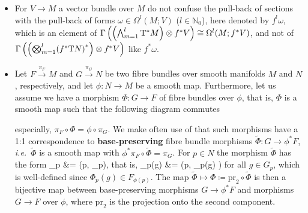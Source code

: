 \documentclass[a4paper,oneside,11pt,bibliography=totoc]{scrartcl}
\def\ba#1\ea{\begin{align}#1\end{align}}
\def\bas#1\eas{\begin{align*}#1\end{align*}}
\theoremstyle{plain}
\theoremstyle{remark}
\theoremstyle{definition}
\begin{document}
\begin{itemize}
	\item For $V \to M$ a vector bundle over $M$ do not confuse the pull-back of sections with the pull-back of forms $\omega \in \Omega^l(M; V)$ ($l \in \mathbb{N}_0$), here denoted by $f^!\omega$, which is an element of $\Gamma\left( \mleft(\bigwedge_{m=1}^{l} \mathrm{T}^*M \mright) \otimes f^*V \right) \cong \Omega^l(M; f^*V)$, and not of $\Gamma\left( \mleft(\bigotimes_{m=1}^{l} \mleft(f^*\mathrm{T}N\mright)^*\mright) \otimes f^*V \right)$ like $f^*\omega$. 
	\item Let $F \stackrel{\pi_F}{\to} M$ and $G \stackrel{\pi_G}{\to} N$ be two fibre bundles over smooth manifolds $M$ and $N$, respectively, and let $\phi: N \to M$ be a smooth map. Furthermore, let us assume we have a morphism $\Phi: G \to F$ of fibre bundles over $\phi$, that is, $\Phi$ is a smooth map such that the following diagram commutes
	\begin{center}
	\end{center}
especially, $\pi_F \circ \Phi = \phi \circ \pi_G$.
We make often use of that such morphisms have a 1:1 correspondence to \textbf{base-preserving} fibre bundle morphisms $\widetilde{\Phi}: G \to \phi^*F$, \textit{i.e.}\ $\widetilde{\Phi}$ is a smooth map with $\phi^*\pi_F \circ \widetilde{\Phi} = \pi_G$. For $p \in N$ the morphism $\widetilde{\Phi}$ has the form
\bas
\widetilde{\Phi}_p
&=
(p, \Phi_p),
\eas
that is,
\bas
\widetilde{\Phi}_p(g)
&=
\bigl(p, \Phi_p(g) \bigr)
\eas
for all $g \in G_p$, which is well-defined since $\Phi_p(g) \in F_{\phi(p)}$. The map $\widetilde{\Phi} \mapsto \Phi \coloneqq \mathrm{pr}_2 \circ \widetilde{\Phi}$ is then a bijective map between base-preserving morphisms $G \to \phi^*F$ and morphisms $G \to F$ over $\phi$, where $\mathrm{pr}_2$ is the projection onto the second component. 


\end{itemize}
\end{document}
